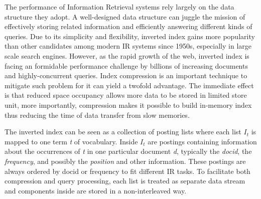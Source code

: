 \documentclass[runningheads,a4paper]{llncs}
\begin{document}
The performance of Information Retrieval systems rely largely on the data structure they adopt.
A well-designed data structure can juggle the mission of effectively storing related information and efficiently answering different kinds of queries.
Due to its simplicity and flexibility, inverted index gains more popularity than other candidates among modern IR systems since 1950s\cite{buttcher2010information,witten1999managing}, especially in large scale search engines.
However, as the rapid growth of the web, inverted index is facing an formidable performance challenge by billions of increasing documents and highly-concurrent queries.
Index compression is an important technique to mitigate such problem for it can yield a twofold advantage.
The immediate effect is that reduced space occupancy allows more data to be stored in limited store unit, more importantly, compression makes it possible to build in-memory index thus reducing the time of data transfer from slow memories\cite{manning2008introduction,zobel2006inverted}.


The inverted index can be seen as a collection of posting lists where each list $I_t$ is mapped to one term \textit{t} of vocabulary.
Inside $I_t$ are postings containing information about the occurrences of \textit{t} in one particular document \textit{d}, typically the \textit{docid}, the \textit{frequency}, and possibly the \textit{position} and other information.
These postings are always ordered by docid or frequency to fit different IR tasks\cite{navarro2010dual}.
To facilitate both compression and query processing, each list is treated as separate data stream and components inside are stored in a non-interleaved way\cite{anh2010index}. 
\end{document}
